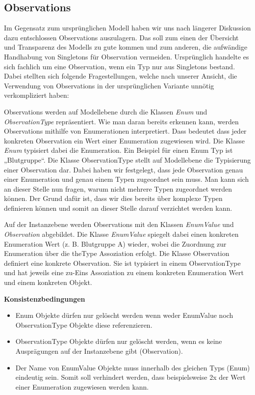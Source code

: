 \subsection{Observations}\label{Observations}
Im Gegensatz zum ursprünglichen Modell haben wir uns nach längerer Diskussion dazu entschlossen Observations auszulagern. 
Das soll zum einen der Übersicht und Transparenz des Modells zu gute kommen und zum anderen, 
die aufwändige Handhabung von Singletons für Observation vermeiden. 
Ursprünglich handelte es sich fachlich um eine Observation, wenn ein Typ nur aus Singletons bestand. 
Dabei stellten sich folgende Fragestellungen, welche nach unserer Ansicht, 
die Verwendung von Observations in der ursprünglichen Variante unnötig verkompliziert haben:


Observations werden auf Modellebene durch die Klassen \emph{Enum} und \emph{ObservationType} repräsentiert. 
Wie man daran bereits erkennen kann, werden Observations mithilfe von Enumerationen interpretiert. 
Dass bedeutet dass jeder konkreten Observation ein Wert einer Enumeration zugewiesen wird. 
Die Klasse \emph{Enum} typisiert dabei die Enumeration. 
Ein Beispiel für einen Enum Typ ist „Blutgruppe“. Die Klasse ObservationType stellt auf Modellebene die 
Typisierung einer Observation dar. Dabei haben wir festgelegt, dass jede Observation genau einer Enumeration 
und genau einem Typen zugeordnet sein muss. Man kann sich an dieser Stelle nun fragen, warum nicht mehrere Typen 
zugeordnet werden können. Der Grund dafür ist, dass wir dies bereits über komplexe Typen definieren können und somit 
an dieser Stelle darauf verzichtet werden kann.

Auf der Instanzebene werden Observations mit den Klassen \emph{EnumValue} und \emph{Observation} abgebildet. 
Die Klasse \emph{EnumValue} spiegelt dabei einen konkreten Enumeration Wert (z. B. Blutgruppe A) wieder, 
wobei die Zuordnung zur Enumeration über die theType Assoziation erfolgt. 
Die Klasse Observation definiert eine konkrete Observation. 
Sie ist typisiert in einem ObservationType und hat jeweils eine zu-Eins Assoziation zu einem konkreten Enumeration Wert 
und einem konkreten Objekt.

\textbf{Konsistenzbedingungen} \newline
\begin{itemize}
  \item Enum Objekte dürfen nur gelöscht werden wenn weder EnumValue noch ObservationType Objekte diese referenzieren.
  \item ObservationType Objekte dürfen nur gelöscht werden, wenn es keine Ausprägungen auf der Instanzebene gibt (Observation).
  \item Der Name von EnumValue Objekte muss innerhalb des gleichen Typs (Enum) eindeutig sein. Somit soll verhindert werden, dass beispielsweise 2x der Wert  einer Enumeration  zugewiesen werden kann.
\end{itemize}

